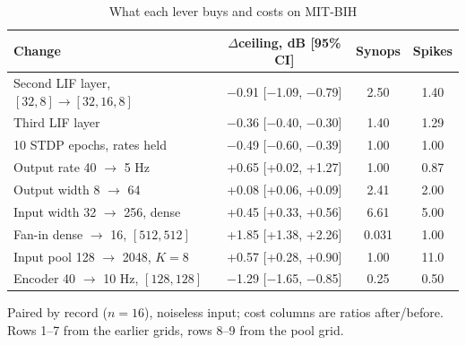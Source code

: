 \begin{table}[t]
\centering
\caption{What each lever buys and costs on MIT-BIH}
\label{tab:levers}
\scriptsize
\setlength{\tabcolsep}{3pt}
\begin{tabular}{@{}lccc@{}}
\toprule
Change & $\Delta$ceiling, dB [95\% CI] & Synops & Spikes \\
\midrule
Second LIF layer, $[32,8]\to[32,16,8]$ & $-$0.91 [$-$1.09, $-$0.79] & 2.50 & 1.40 \\
Third LIF layer & $-$0.36 [$-$0.40, $-$0.30] & 1.40 & 1.29 \\
10 STDP epochs, rates held & $-$0.49 [$-$0.60, $-$0.39] & 1.00 & 1.00 \\
Output rate 40 $\to$ 5 Hz & +0.65 [+0.02, +1.27] & 1.00 & 0.87 \\
Output width 8 $\to$ 64 & +0.08 [+0.06, +0.09] & 2.41 & 2.00 \\
Input width 32 $\to$ 256, dense & +0.45 [+0.33, +0.56] & 6.61 & 5.00 \\
Fan-in dense $\to$ 16, $[512,512]$ & +1.85 [+1.38, +2.26] & 0.031 & 1.00 \\
Input pool 128 $\to$ 2048, $K=8$ & +0.57 [+0.28, +0.90] & 1.00 & 11.0 \\
Encoder 40 $\to$ 10 Hz, $[128,128]$ & $-$1.29 [$-$1.65, $-$0.85] & 0.25 & 0.50 \\
\bottomrule
\end{tabular}

\vspace{2pt}
\parbox{\columnwidth}{\scriptsize Paired by record ($n=16$), noiseless input; cost columns are ratios after/before. Rows 1--7 from the earlier grids, rows 8--9 from the pool grid.}
\end{table}
